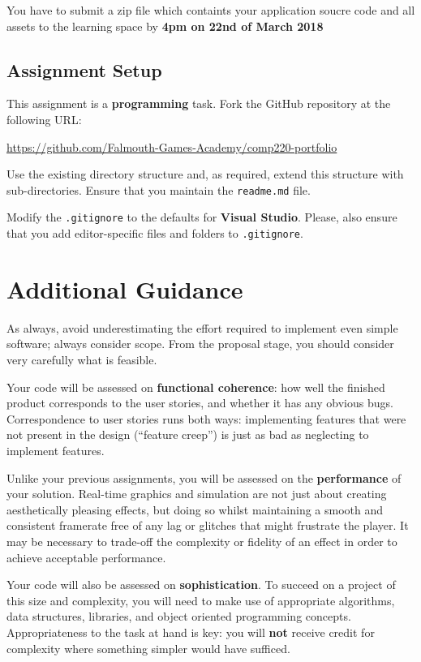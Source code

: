 \documentclass{../../fal_assignment}
\begin{document}
You have to submit a zip file which containts your application soucre code and all assets to the learning space by \textbf{4pm on 22nd of March 2018}

\subsection*{Assignment Setup}

This assignment is a \textbf{programming} task. Fork the GitHub repository at the following URL:

\indent \url{https://github.com/Falmouth-Games-Academy/comp220-portfolio}

Use the existing directory structure and, as required, extend this structure with sub-directories.
Ensure that you maintain the \texttt{readme.md} file.

Modify the \texttt{.gitignore} to the defaults for \textbf{Visual Studio}.
Please, also ensure that you add editor-specific files and folders to \texttt{.gitignore}. 

\section*{Additional Guidance}

As always, avoid underestimating the effort required to implement even simple software; always consider scope.
From the proposal stage, you should consider very carefully what is feasible.

Your code will be assessed on \textbf{functional coherence}:
how well the finished product corresponds to the user stories,
and whether it has any obvious bugs.
Correspondence to user stories runs both ways:
implementing features that were not present in the design (``feature creep'')
is just as bad as neglecting to implement features.

Unlike your previous assignments,
you will be assessed on the \textbf{performance} of your solution.
Real-time graphics and simulation are not just about creating aesthetically pleasing effects,
but doing so whilst maintaining a smooth and consistent framerate free of any lag or glitches that might frustrate the player.
It may be necessary to trade-off the complexity or fidelity of an effect
in order to achieve acceptable performance.

Your code will also be assessed on \textbf{sophistication}.
To succeed on a project of this size and complexity,
you will need to make use of appropriate algorithms, data structures, libraries, and object oriented programming concepts.
Appropriateness to the task at hand is key:
you will \textbf{not} receive credit for complexity  
where something simpler would have sufficed.
\end{document}
